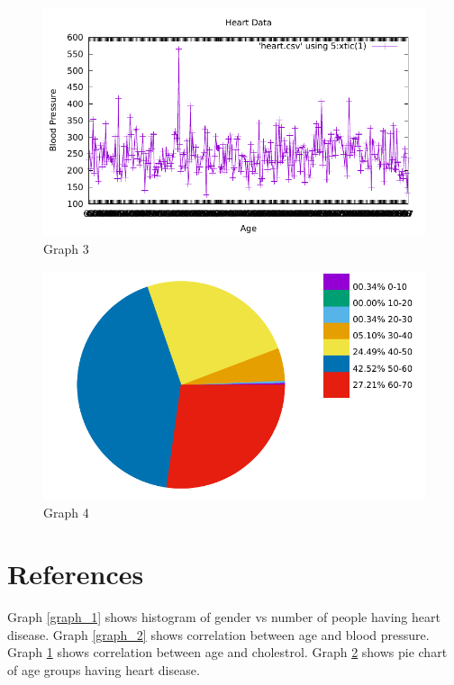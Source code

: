 \documentclass{article}
\begin{document}
\begin{figure}[h]
\includegraphics[width=\textwidth]{./graph_q4_c.pdf}
\caption{\label{graph_3} Graph 3}
\end{figure}
\begin{figure}[h]
\includegraphics[width=\textwidth]{./graph_q4_d.pdf}
\caption{\label{graph_4} Graph 4}
\end{figure}
\section{References}
Graph \ref{graph_1} shows histogram of gender vs number of people having heart disease. Graph \ref{graph_2} shows correlation between age and blood pressure. Graph \ref{graph_3} shows correlation between age and cholestrol. Graph \ref{graph_4} shows pie chart of age groups having heart disease.
\end{document}

